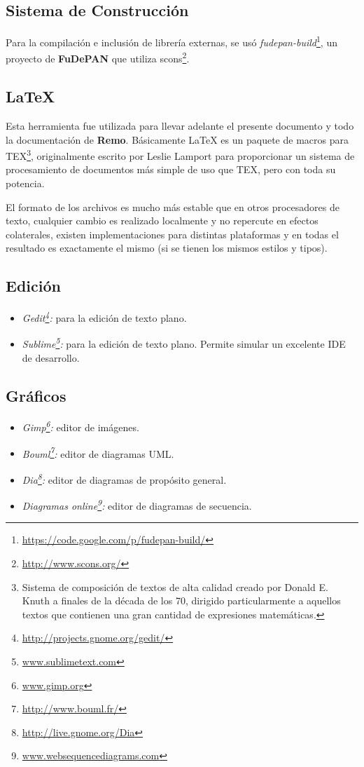 \subsection{Sistema de Construcción}
Para la compilación e inclusión de librería externas, se usó \emph{fudepan-build}\footnote{\url{https://code.google.com/p/fudepan-build/}}, un proyecto de \textbf{FuDePAN} que utiliza scons\footnote{\url{http://www.scons.org/}}.

\subsection{\LaTeX}
\par Esta herramienta fue utilizada para llevar adelante el presente documento y todo la documentación de \textbf{Remo}. Básicamente \LaTeX{}\cite{latex} es un paquete de macros para TEX\footnote{Sistema de composición de textos de alta calidad creado por Donald E. Knuth a finales de la década de los 70, dirigido particularmente a aquellos textos que contienen una gran cantidad de expresiones matemáticas.}, originalmente escrito por Leslie Lamport para proporcionar un sistema de procesamiento de documentos más simple de uso que TEX, pero con toda su potencia. 
\par El formato de los archivos es mucho más estable que en otros procesadores de texto, cualquier cambio es realizado localmente y no repercute en efectos colaterales, existen implementaciones para distintas plataformas y en todas el resultado es exactamente el mismo (si se tienen los mismos estilos y tipos). 

\subsection{Edición}
\begin{itemize}
	\item \emph{Gedit\footnote{\url{http://projects.gnome.org/gedit/}}:} para la edición de texto plano.   
    \item \emph{Sublime\footnote{\url{www.sublimetext.com}}:} para la edición de texto plano. Permite simular un excelente IDE de desarrollo.
\end{itemize}

\subsection{Gráficos}
\begin{itemize}
	\item \emph{Gimp\footnote{\url{www.gimp.org}}:} editor de imágenes.
	\item \emph{Bouml\footnote{\url{http://www.bouml.fr/}}:} editor de diagramas UML.
	\item \emph{Dia\footnote{\url{http://live.gnome.org/Dia}}:} editor de diagramas de propósito general.
    \item \emph{Diagramas online\footnote{\url{www.websequencediagrams.com}}:} editor de diagramas de secuencia.
\end{itemize}

